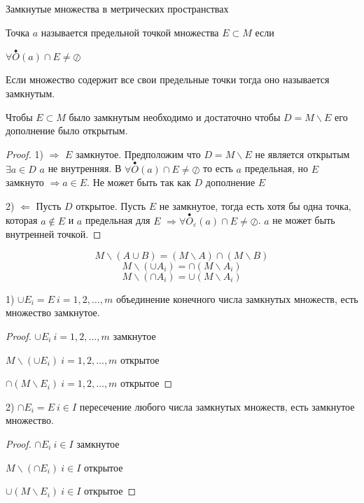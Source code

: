 \begin{title}[\Large]
  Замкнутые множества в метрических пространствах
\end{title}

\begin{define}
  Точка $a$ называется предельной точкой множества $E \subset M$ если

  $\forall \stackrel{\bullet}{O}(a) \cap E \not= \oslash$
\end{define}

\begin{define}
  Если множество содержит все свои предельные точки тогда оно называется
  замкнутым.
\end{define}

\begin{block}[Критерий]
  Чтобы $E \subset M$ было замкнутым необходимо и
  достаточно чтобы $D = M\backslash E$ его дополнение было открытым.
\end{block}

\begin{proof}
  1) $\Rightarrow$ $E$ замкнутое. Предположим что $D = M \backslash E$ не
  является открытым $\exists a \in D$ $a$ не внутренняя. В $\forall
  \stackrel{\bullet}{O}(a) \cap E \not= \oslash$ то есть $a$ предельная, но $E$
  замкнуто $\Rightarrow a \in E$. Не может быть так как $D$ дополнение $E$

  2) $\Leftarrow$ Пусть $D$ открытое. Пусть $E$ не замкнутое, тогда есть хотя
  бы одна
  точка, которая $a \not\in E$ и $a$ предельная для $E$ $\Rightarrow \forall
  \stackrel{\bullet}{O}_{\varepsilon}(a) \cap E \not= \oslash$. $a$ не может
  быть внутренней точкой.
\end{proof}

\begin{block}
  $$
  M \backslash (A \cup B) = (M \backslash A) \cap (M \backslash B)
  $$
  $$
  M \backslash (\cup A_i) = \cap (M \backslash A_i)
  $$
  $$
  M \backslash (\cap A_i) = \cup (M \backslash A_i)
  $$
\end{block}

\begin{block}[Свойства]
  1) $\cup E_i = E ~ i = 1,2, \ldots, m$ объединение конечного числа
  замкнутых множеств, есть множество замкнутое.

  \begin{proof}
    $\cup E_i ~ i = 1,2, \ldots, m$ замкнутое

    $M \backslash (\cup E_i) ~ i = 1,2, \ldots, m$ открытое

    $\cap (M \backslash E_i) ~ i = 1,2, \ldots, m$ открытое
  \end{proof}

  2) $\cap E_i = E ~ i \in I$ пересечение любого числа замкнутых множеств,
  есть замкнутое множество.

  \begin{proof}
    $\cap E_i ~ i \in I$ замкнутое

    $M \backslash (\cap E_i) ~ i \in I$ открытое

    $\cup (M \backslash E_i) ~ i \in I$ открытое
  \end{proof}
\end{block}

